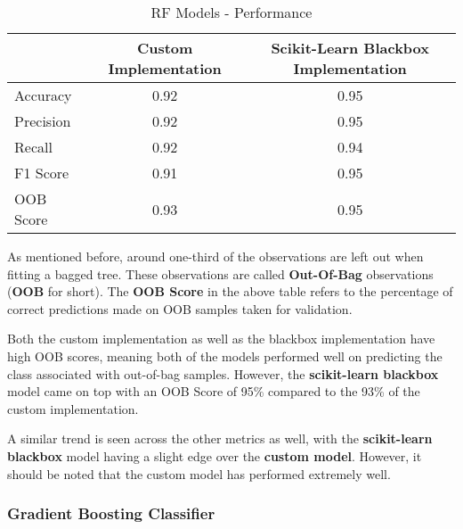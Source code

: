 \begin{table}[H]
  \centering
  \begin{tabular}{lcc}
    \toprule
              & \textbf{Custom Implementation} & \textbf{Scikit-Learn Blackbox Implementation} \\
    \midrule
    Accuracy  & {0.92}                         & 0.95                                          \\
    Precision & {0.92}                         & 0.95                                          \\
    Recall    & 0.92                           & {0.94}                                        \\
    F1 Score  & 0.91                           & {0.95}                                        \\
    OOB Score & 0.93                           & {0.95}                                        \\
    \bottomrule
  \end{tabular}
  \caption{RF Models - Performance}
  \label{tab:rf_model_performance}
\end{table}

As mentioned before, around one-third of the observations are left out when fitting a bagged tree. These observations are called \textbf{Out-Of-Bag} observations (\textbf{OOB} for short). The \textbf{OOB Score} in the above table refers to the percentage of correct predictions made on OOB samples taken for validation.

Both the custom implementation as well as the blackbox implementation have high OOB scores, meaning both of the models performed well on predicting the class associated with out-of-bag samples. However, the \textbf{scikit-learn blackbox} model came on top with an OOB Score of 95\% compared to the 93\% of the custom implementation.

A similar trend is seen across the other metrics as well, with the \textbf{scikit-learn blackbox} model having a slight edge over the \textbf{custom model}. However, it should be noted that the custom model has performed extremely well.

\subsubsection{Gradient Boosting Classifier}

